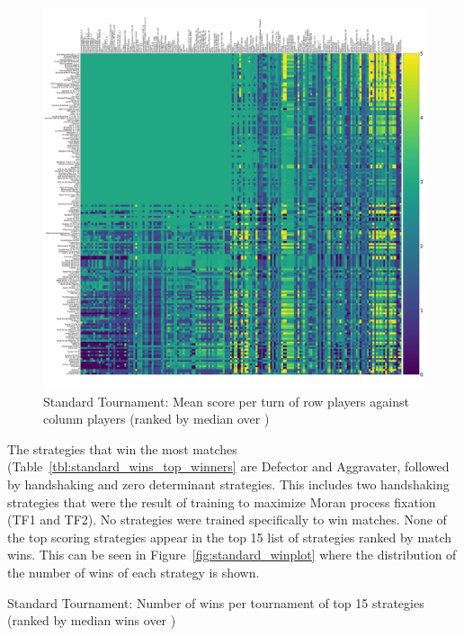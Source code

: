 \documentclass{article}
\begin{document}
\begin{figure}[!hbtp]
    \centering
    \includegraphics[width=\textwidth]{./assets/standard_scores_heatmap.pdf}
    \caption{Standard Tournament: Mean score per turn of row players against
    column players (ranked by median over
        \protecttournaments)}
    \label{fig:standard_heatmap}
\end{figure}

The strategies that win the most matches
(Table~\ref{tbl:standard_wins_top_winners} are Defector and Aggravater, followed
by handshaking and zero determinant strategies. This includes two handshaking
strategies that were the result of training to maximize Moran process fixation
(TF1 and TF2). No strategies were trained specifically to win matches. None of
the top scoring strategies appear in the top 15 list of strategies ranked by
match wins. This can be seen in Figure~\ref{fig:standard_winplot} where the
distribution of the number of wins of each strategy is shown.

\begin{table}[!hbtp]
    \centering
        
        \caption{Standard Tournament: Number of wins per tournament
        of top 15 strategies (ranked by median wins over
        \protecttournaments)}
        \label{tbl:standard_wins_top_winners}
\end{table}
\end{document}
